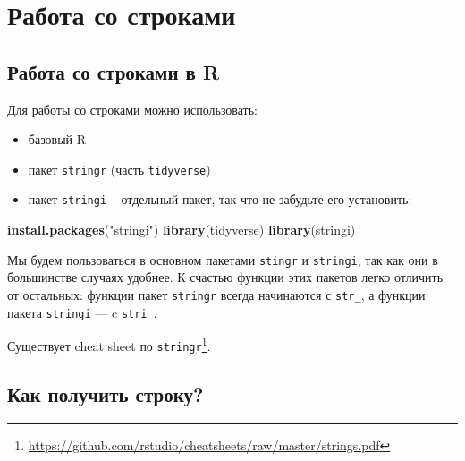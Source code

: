 \documentclass[
]{book}
\newenvironment{Shaded}{\begin{snugshade}}{\end{snugshade}}
\newcommand{\KeywordTok}[1]{\textcolor[rgb]{0.13,0.29,0.53}{\textbf{#1}}}
\newcommand{\NormalTok}[1]{#1}
\newcommand{\StringTok}[1]{\textcolor[rgb]{0.31,0.60,0.02}{#1}}
\providecommand{\tightlist}{%
  \setlength{\itemsep}{0pt}\setlength{\parskip}{0pt}}
\renewcommand{\href}[2]{#2\footnote{\url{#1}}}
\begin{document}
\hypertarget{strings}{%
\chapter{Работа со строками}\label{strings}}

\hypertarget{ux440ux430ux431ux43eux442ux430-ux441ux43e-ux441ux442ux440ux43eux43aux430ux43cux438-ux432-r}{%
\section{Работа со строками в R}\label{ux440ux430ux431ux43eux442ux430-ux441ux43e-ux441ux442ux440ux43eux43aux430ux43cux438-ux432-r}}

Для работы со строками можно использовать:

\begin{itemize}
\tightlist
\item
  базовый R
\item
  пакет \texttt{stringr} (часть \texttt{tidyverse})
\item
  пакет \texttt{stringi} -- отдельный пакет, так что не забудьте его установить:
\end{itemize}

\begin{Shaded}
\begin{Highlighting}[]
\KeywordTok{install.packages}\NormalTok{(}\StringTok{"stringi"}\NormalTok{)}
\KeywordTok{library}\NormalTok{(tidyverse)}
\KeywordTok{library}\NormalTok{(stringi)}
\end{Highlighting}
\end{Shaded}

Мы будем пользоваться в основном пакетами \texttt{stingr} и \texttt{stringi}, так как они в большинстве случаях удобнее. К счастью функции этих пакетов легко отличить от остальных: функции пакет \texttt{stringr} всегда начинаются с \texttt{str\_}, а функции пакета \texttt{stringi} --- c \texttt{stri\_}.

Существует \href{https://github.com/rstudio/cheatsheets/raw/master/strings.pdf}{cheat sheet по \texttt{stringr}}.

\hypertarget{ux43aux430ux43a-ux43fux43eux43bux443ux447ux438ux442ux44c-ux441ux442ux440ux43eux43aux443}{%
\section{Как получить строку?}\label{ux43aux430ux43a-ux43fux43eux43bux443ux447ux438ux442ux44c-ux441ux442ux440ux43eux43aux443}}
\end{document}
